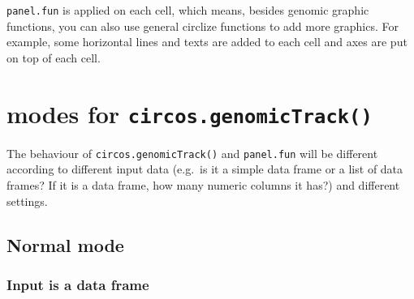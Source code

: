 \documentclass[]{book}
\newenvironment{Shaded}{\begin{snugshade}}{\end{snugshade}}
\newcommand{\KeywordTok}[1]{\textcolor[rgb]{0.13,0.29,0.53}{\textbf{#1}}}
\newcommand{\DataTypeTok}[1]{\textcolor[rgb]{0.13,0.29,0.53}{#1}}
\newcommand{\DecValTok}[1]{\textcolor[rgb]{0.00,0.00,0.81}{#1}}
\newcommand{\FloatTok}[1]{\textcolor[rgb]{0.00,0.00,0.81}{#1}}
\newcommand{\StringTok}[1]{\textcolor[rgb]{0.31,0.60,0.02}{#1}}
\newcommand{\ControlFlowTok}[1]{\textcolor[rgb]{0.13,0.29,0.53}{\textbf{#1}}}
\newcommand{\OperatorTok}[1]{\textcolor[rgb]{0.81,0.36,0.00}{\textbf{#1}}}
\newcommand{\NormalTok}[1]{#1}
\begin{document}
\texttt{panel.fun} is applied on each cell, which means, besides genomic
graphic functions, you can also use general circlize functions to add
more graphics. For example, some horizontal lines and texts are added to
each cell and axes are put on top of each cell.

\begin{Shaded}
\end{Shaded}

\chapter{\texorpdfstring{modes for
\texttt{circos.genomicTrack()}}{modes for circos.genomicTrack()}}\label{modes-of-input}

The behaviour of \texttt{circos.genomicTrack()} and \texttt{panel.fun}
will be different according to different input data (e.g.~is it a simple
data frame or a list of data frames? If it is a data frame, how many
numeric columns it has?) and different settings.

\section{Normal mode}\label{normal-mode}

\subsection{Input is a data frame}\label{input-is-a-data-frame}
\end{document}
